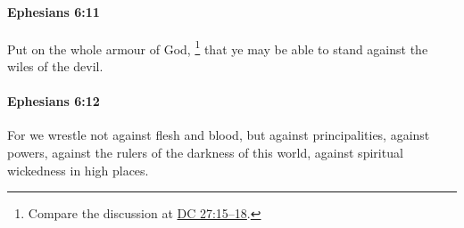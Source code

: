 		\paragraph{Ephesians 6:11} %
			\label{EPHESIANS-6-11}

			Put on the whole armour of God,%
				\footnote{%
					\label{}%
					Compare the discussion at \hyperref[DC27-15]{DC 27:15--18}.
					}
			that ye may be able to stand against the wiles of the devil.

			\begin{framed}
			\scriptsize
				\begin{compactdesc}
					\item[SBLG] 
				\end{compactdesc}
			\end{framed}

		\paragraph{Ephesians 6:12} %
			\label{EPHESIANS-6-12}

			For we wrestle not against flesh and blood, but against principalities, against powers, against the rulers of the darkness of this world, against spiritual wickedness in high places.


